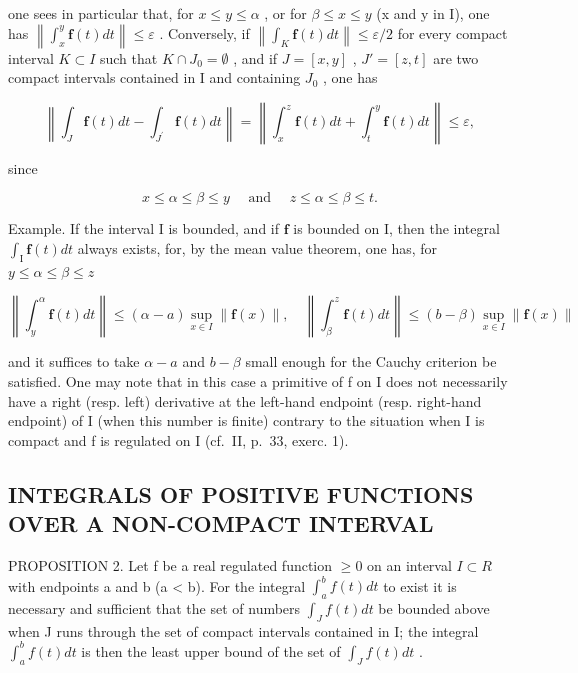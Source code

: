 one sees in particular that, for \(x \leqslant y \leqslant \alpha\) , or for \(\beta \leqslant x \leqslant y\) (x and y in I), one has \(\left\|\int_{x}^{y} \mathbf{f}(t) dt\right\| \leqslant \varepsilon\) . Conversely, if \(\left\|\int_{K} \mathbf{f}(t) dt\right\| \leqslant \varepsilon/2\) for every compact interval \(K \subset I\) such that \(K \cap J_{0} = \emptyset\) , and if \(J = [x, y]\) , \(J' = [z, t]\) are two compact intervals contained in I and containing \(J_{0}\) , one has

\[
\left\| \int_ {J} \mathbf {f} (t) d t - \int_ {J ^ {\prime}} \mathbf {f} (t) d t \right\| = \left\| \int_ {x} ^ {z} \mathbf {f} (t) d t + \int_ {t} ^ {y} \mathbf {f} (t) d t \right\| \leqslant \varepsilon ,
\]

since

\[
x \leqslant \alpha \leqslant \beta \leqslant y \quad \text { and } \quad z \leqslant \alpha \leqslant \beta \leqslant t.
\]

Example. If the interval I is bounded, and if \(\mathbf{f}\) is bounded on I, then the integral \(\int_{\mathrm{I}}\mathbf{f}(t)dt\) always exists, for, by the mean value theorem, one has, for \(y\leqslant \alpha \leqslant \beta \leqslant z\)

\[
\left\| \int_ {y} ^ {\alpha} \mathbf {f} (t) d t \right\| \leqslant (\alpha - a) \sup _ {x \in I} \| \mathbf {f} (x) \|, \quad \left\| \int_ {\beta} ^ {z} \mathbf {f} (t) d t \right\| \leqslant (b - \beta) \sup _ {x \in I} \| \mathbf {f} (x) \|
\]

and it suffices to take \(\alpha - a\) and \(b - \beta\) small enough for the Cauchy criterion be satisfied. One may note that in this case a primitive of f on I does not necessarily have a right (resp. left) derivative at the left-hand endpoint (resp. right-hand endpoint) of I (when this number is finite) contrary to the situation when I is compact and f is regulated on I (cf.~II, p.~33, exerc. 1).

\subsection{INTEGRALS OF POSITIVE FUNCTIONS OVER A NON-COMPACT INTERVAL}

PROPOSITION 2. Let f be a real regulated function \(\geqslant 0\) on an interval \(I \subset R\) with endpoints a and b (a \textless{} b). For the integral \(\int_{a}^{b} f(t) dt\) to exist it is necessary and sufficient that the set of numbers \(\int_{J} f(t) dt\) be bounded above when J runs through the set of compact intervals contained in I; the integral \(\int_{a}^{b} f(t) dt\) is then the least upper bound of the set of \(\int_{J} f(t) dt\) .

